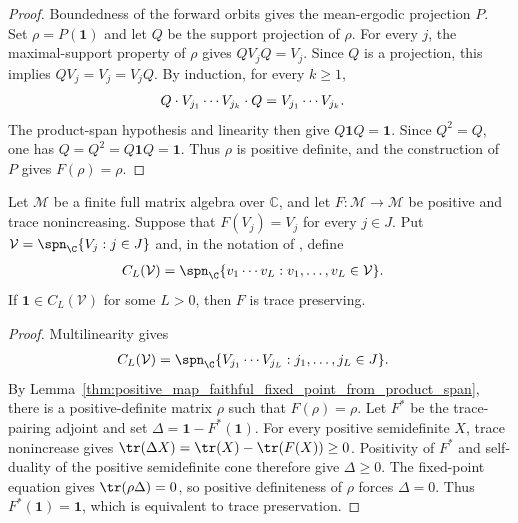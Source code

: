\begin{proof}\leanok
    Boundedness of the forward orbits gives the mean-ergodic projection $P$.
    Set $\rho=P(\mathbf 1)$ and let $Q$ be the support projection of $\rho$.
    For every $j$, the maximal-support property of $\rho$ gives
    $QV_jQ=V_j$. Since $Q$ is a projection, this implies
    $QV_j=V_j=V_jQ$. By induction, for every $k\geq1$,
    \begin{align}
        Q\cdot V_{j_1}\cdots V_{j_k}\cdot Q
         & =V_{j_1}\cdots V_{j_k}.
        \notag
    \end{align}
    The product-span hypothesis and linearity then give
    $Q\mathbf 1Q=\mathbf 1$. Since $Q^2=Q$, one has
    $Q=Q^2=Q\mathbf 1Q=\mathbf 1$. Thus $\rho$ is positive definite, and the
    construction of $P$ gives $F(\rho)=\rho$.
\end{proof}

\begin{lemma}
    \label{thm:positive_map_trace_preserving_from_fixed_product_span}
    \leanok
    Let $\mathcal M$ be a finite full matrix algebra over $\mathbb C$, and let
    $F:\mathcal M\to\mathcal M$ be positive and trace nonincreasing. Suppose
    that $F(V_j)=V_j$ for every $j\in J$. Put
    $\mathcal V=\spn_{\C}\{V_j:j\in J\}$ and, in the notation of
    \cite[Appendix~C.4]{Cirac2016MPDO_arXiv}, define
    \begin{align}
        C_L(\mathcal V)
         & =\spn_{\C}\{v_1\cdots v_L:v_1,\ldots,v_L\in\mathcal V\}.
        \notag
    \end{align}
    If $\mathbf 1\in C_L(\mathcal V)$ for some $L>0$, then $F$ is trace
    preserving.
\end{lemma}

\begin{proof}\leanok
    Multilinearity gives
    \begin{align}
        C_L(\mathcal V)
         & =\spn_{\C}\{V_{j_1}\cdots V_{j_L}:j_1,\ldots,j_L\in J\}.
        \notag
    \end{align}
    By Lemma~\ref{thm:positive_map_faithful_fixed_point_from_product_span},
    there is a positive-definite matrix $\rho$ such that $F(\rho)=\rho$.
    Let $F^*$ be the trace-pairing adjoint and set
    $\Delta=\mathbf 1-F^*(\mathbf 1)$. For every positive semidefinite $X$,
    trace nonincrease gives
    $\tr(\Delta X)=\tr(X)-\tr(F(X))\geq0$.
    Positivity of $F^*$ and self-duality of the positive semidefinite cone
    therefore give $\Delta\geq0$. The fixed-point equation gives
    $\tr(\rho\Delta)=0$, so positive definiteness of $\rho$ forces
    $\Delta=0$. Thus $F^*(\mathbf 1)=\mathbf 1$, which is equivalent to trace
    preservation.
\end{proof}

